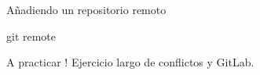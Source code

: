 \begin{frame}[t]{Añadiendo un repositorio remoto}
    \begin{comando}
        git remote
    \end{comando}

\end{frame}

\begin{frame}[t]{A practicar !}
    Ejercicio largo de conflictos y GitLab.

\end{frame}
